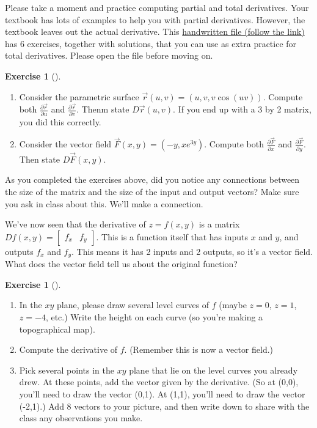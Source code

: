 \documentclass[10pt,]{book}
\theoremstyle{plain}
\theoremstyle{definition}
\theoremstyle{definition}
\theoremstyle{definition}
\theoremstyle{definition}
\newtheorem{exploration}[project]{Exercise}
\theoremstyle{definition}
\numberwithin{equation}{section}
\newcommand{\ds}{\displaystyle}
\newcommand{\amp}{&}
\begin{document}
Please take a moment and practice computing partial and total derivatives. Your textbook has lots of examples to help you with partial derivatives. However, the textbook leaves out the actual derivative. This \href{http://db.tt/cSeKG8XO}{handwritten file (follow the link)} has 6 exercises, together with solutions, that you can use as extra practice for total derivatives. Please open the file before moving on.%
\begin{exploration}[]\label{exploration-137}
\leavevmode%
\begin{enumerate}[font=\bfseries,label=(\alph*),ref=\alph*]
\item\label{task-287} Consider the parametric surface \(\vec r(u,v) = (u,v,v\cos(uv))\). Compute both \(\ds\frac{\partial \vec r}{\partial u}\) and \(\ds\frac{\partial \vec r}{\partial v}\). Thenm state \(D\vec r(u,v)\). If you end up with a 3 by 2 matrix, you did this correctly.%
\item\label{task-288} Consider the vector field \(\vec F(x,y) = (-y,xe^{3y})\). Compute both \(\ds\frac{\partial \vec F}{\partial x}\) and \(\ds\frac{\partial \vec F}{\partial y}\). Then state \(D\vec F(x,y)\).%
\end{enumerate}
\end{exploration}
As you completed the exercises above, did you notice any connections between the size of the matrix and the size of the input and output vectors? Make sure you ask in class about this. We'll make a connection.%
\par
We've now seen that the derivative of \(z=f(x,y)\) is a matrix \(Df(x,y) = \begin{bmatrix}f_x \amp  f_y
\end{bmatrix}\). This is a function itself that has inputs \(x\) and \(y\), and outputs \(f_x\) and \(f_y\). This means it has 2 inputs and 2 outputs, so it's a vector field. What does the vector field tell us about the original function?%
\begin{exploration}[]\label{exploration-138}
\leavevmode%
\begin{enumerate}[font=\bfseries,label=(\alph*),ref=\alph*]
\item\label{task-289} In the \(xy\) plane, please draw several level curves of \(f\) (maybe \(z=0\), \(z=1\), \(z=-4\), etc.)  Write the height on each curve (so you're making a topographical map).%
\item\label{task-290} Compute the derivative of \(f\). (Remember this is now a vector field.)%
\item\label{task-291} Pick several points in the \(xy\) plane that lie on the level curves you already drew.  At these points, add the vector given by the derivative.  (So at (0,0), you'll need to draw the vector (0,1).  At (1,1), you'll need to draw the vector (-2,1).) Add 8 vectors to your picture, and then write down to share with the class any observations you make.%
\end{enumerate}
\end{exploration}
\end{document}
